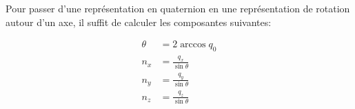 \documentclass[12pt,a4paper]{report}
\begin{document}
\begin{appendix}
		\para Pour passer d'une représentation en quaternion en une représentation de rotation autour d'un axe, il suffit de calculer les composantes suivantes:
		
		\begin{equation*}
		\begin{aligned}
			\theta 	&= 2 \arccos{q_0} \\
			n_x 	&= \frac{q_x}{\sin{\theta}} \\
			n_y		&= \frac{q_y}{\sin{\theta}} \\
			n_z		&= \frac{q_z}{\sin{\theta}} 
		\end{aligned}
		\end{equation*}

\end{appendix}

\nocite{*}


\end{document}
